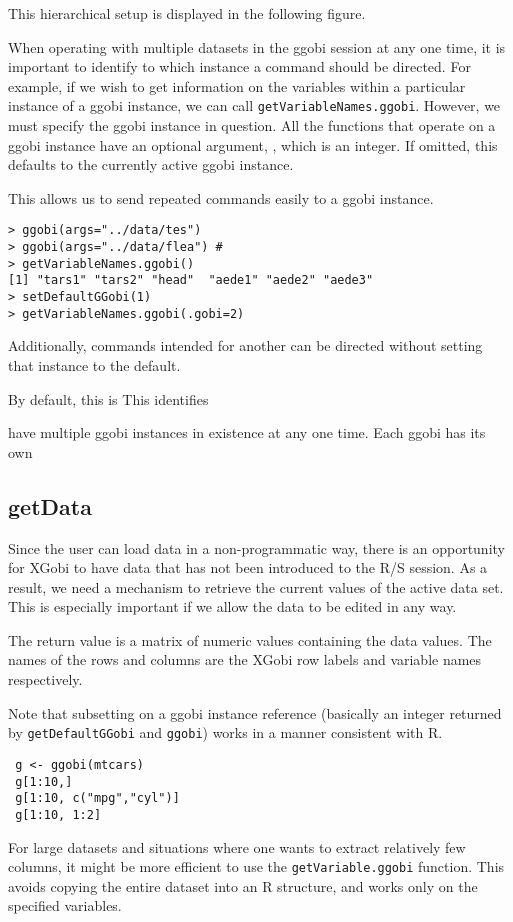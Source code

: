 \documentclass{article}
\def\SFunction#1{{\texttt{\red #1}}}
\begin{document}
This hierarchical setup is displayed in the following
figure.
\begin{center}
\end{center}

When operating with multiple datasets in the ggobi session at any one
time, it is important to identify to which instance a command should
be directed.  For example, if we wish to get information on the
variables within a particular instance of a ggobi instance, we can
call \SFunction{getVariableNames.ggobi}. However, we must
specify the ggobi instance in question. All the functions
that operate on a ggobi instance have an optional argument,
, which is an integer.
If omitted, this defaults to the currently active
ggobi instance.

This allows us to send repeated commands easily to a ggobi instance.
\begin{verbatim}
> ggobi(args="../data/tes") 
> ggobi(args="../data/flea") #
> getVariableNames.ggobi()
[1] "tars1" "tars2" "head"  "aede1" "aede2" "aede3"
> setDefaultGGobi(1)
> getVariableNames.ggobi(.gobi=2)
\end{verbatim}
Additionally, commands intended for another can be directed without
setting that instance to the default.

By default, this is 
This identifies 


have multiple ggobi
instances in existence at any one time.
Each ggobi has its own


\subsection{getData}
Since the user can load data in a non-programmatic way, there is an
opportunity for XGobi to have data that has not been introduced to the
R/S session.  As a result, we need a mechanism to retrieve the current
values of the active data set.  This is especially important if we
allow the data to be edited in any way.

The return value is a matrix of numeric values containing the data
values.  The names of the rows and columns are the XGobi row labels
and variable names respectively.

Note that subsetting on a ggobi instance reference (basically an
integer returned by \SFunction{getDefaultGGobi} and \SFunction{ggobi})
works in a manner consistent with R.
\begin{verbatim}
 g <- ggobi(mtcars)
 g[1:10,]
 g[1:10, c("mpg","cyl")]
 g[1:10, 1:2]
\end{verbatim}
For large datasets and situations where one wants to extract
relatively few columns, it might be more efficient to use the
\SFunction{getVariable.ggobi} function.
This avoids copying the entire dataset into an R structure,
and works only on the specified variables.
\end{document}
